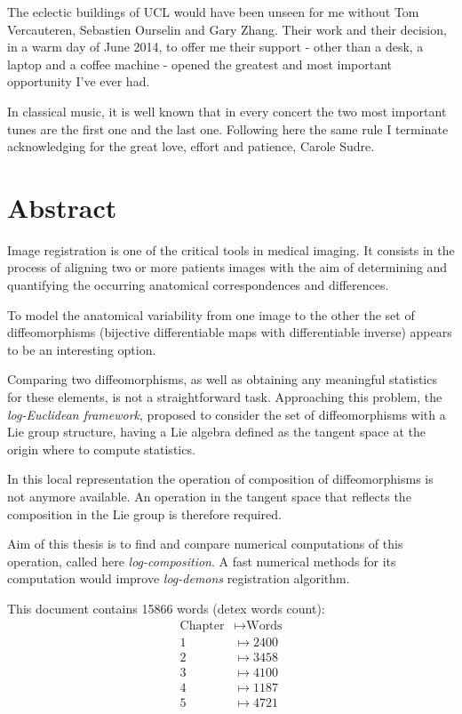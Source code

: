 The eclectic buildings of UCL would have been unseen for me without Tom Vercauteren, Sebastien Ourselin and Gary Zhang. Their work and their decision, in a warm day of June 2014, to offer me their support - other than a desk, a laptop and a coffee machine - opened the greatest and most important opportunity I've ever had.
 
In classical music, it is well known that in every concert the two most important tunes are the first one and the last one. Following here the same rule I terminate acknowledging for the great love, effort and patience, Carole Sudre.


\qquad
\pagestyle{empty}
\newpage


\section*{Abstract}

Image registration is one of the critical tools in medical imaging. It consists in the process of aligning two or more patients images with the aim of determining and quantifying the occurring anatomical correspondences and differences. 

To model the anatomical variability from one image to the other the set of diffeomorphisms (bijective differentiable maps with differentiable inverse) appears to be an interesting option.

Comparing two diffeomorphisms, as well as obtaining any meaningful statistics for these elements, is not a straightforward task.
Approaching this problem, the \emph{log-Euclidean framework}, proposed to consider the set of diffeomorphisms with a Lie group structure, having a Lie algebra defined as the tangent space at the origin where to compute statistics.

In this local representation the operation of composition of diffeomorphisms is not anymore available. An operation in the tangent space that reflects the composition in the Lie group is therefore required.

Aim of this thesis is to find and compare numerical computations of this operation, called here \emph{log-composition}. 
A fast numerical methods for its computation would improve \emph{log-demons} registration algorithm.

\vspace{1cm}

This document contains 15866 words (detex words count):
\begin{align*}
\text{Chapter} &\mapsto \text{Words} \\
1 &\mapsto 2400\\  
2 &\mapsto 3458 \\
3 &\mapsto 4100 \\
4 &\mapsto 1187\\ 
5 &\mapsto 4721
\end{align*}


